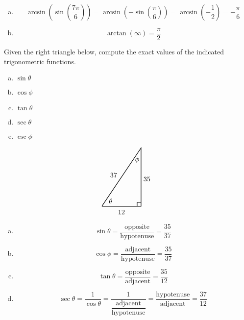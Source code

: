 \documentclass[12pt,letterpaper]{exam}
\begin{document}
\begin{questions}
{\begin{enumerate}[(a)]
\item 
	\[
	\arcsin \!\left( \sin \left( \dfrac{7\pi}{6} \right) \right)= \arcsin \!\left( -\sin \left( \dfrac{\pi}{6} \right) \right)= \arcsin \left( -\dfrac{1}{2} \right)= -\dfrac{\pi}{6}
	\] \pspace

\item 
	\[
	\arctan(\infty)= \dfrac{\pi}{2}
	\] 
\end{enumerate}
}
	


\newpage
\question[10] Given the right triangle below, compute the exact values of the indicated trigonometric functions. \pspace
\begin{minipage}{0.3\textwidth}
        \begin{enumerate}[(a)]
        \item $\sin \theta$
        \item $\cos \phi$
        \item $\tan \theta$
        \item $\sec \theta$
        \item $\csc \phi$
        \end{enumerate}
\end{minipage} \begin{minipage}{0.27\textwidth}        
	\[
	\begin{tikzpicture}
	\draw[line width=0.03cm] (0,0) -- (2,0) -- (2,3) -- (0,0);
	\draw[line width=0.03cm] (1.8,0) -- (1.8,0.2) -- (2,0.2);
	\node at (0.45,0.27) {$\theta$};
	\node at (1.8,2.4) {$\phi$};
	\node at (1,-0.3) {$12$};
	\node at (2.3,1.4) {$35$};
	\node at (0.6,1.6) {$37$};
	\end{tikzpicture}
	\]
\end{minipage} \pspace

{\itshape \sol 
\begin{enumerate}[(a)]
\item 
	\[
	\sin \theta= \dfrac{\text{opposite}}{\text{hypotenuse}}= \dfrac{35}{37}
	\] \pspace

\item 
	\[
	\cos \phi= \dfrac{\text{adjacent}}{\text{hypotenuse}}= \dfrac{35}{37}
	\] \pspace

\item 
	\[
	\tan \theta= \dfrac{\text{opposite}}{\text{adjacent}}= \dfrac{35}{12}
	\] \pspace

\item 
	\[
	\sec \theta= \dfrac{1}{\cos \theta}= \dfrac{1}{\dfrac{\text{adjacent}}{\text{hypotenuse}}}= \dfrac{\text{hypotenuse}}{\text{adjacent}}= \dfrac{37}{12}
	\] \pspace


\end{enumerate}}
\end{questions}
\end{document}
